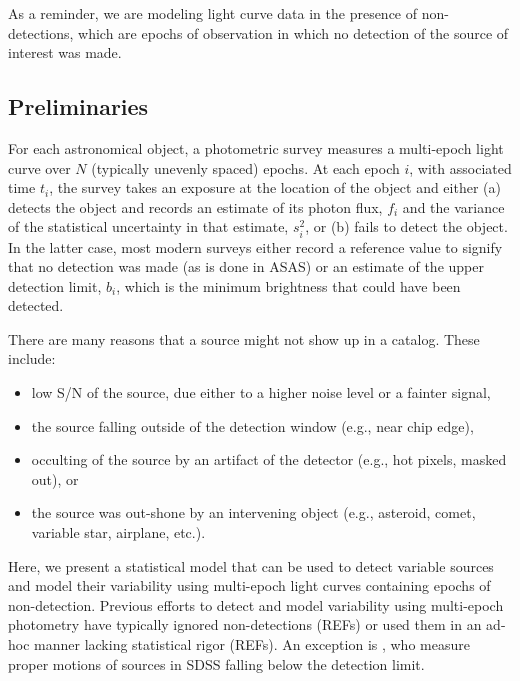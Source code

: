 \documentclass[12pt,preprint]{aastex}
\newcommand{\fobs}{f_i}
\newcommand{\sobs}{s^2_i}
\begin{document}

As a reminder, we are modeling light curve data in the presence of non-detections, which are epochs of observation in which no detection of the source of interest was made.

\subsection{Preliminaries}
\label{ss:prelim}

For each astronomical object, a photometric survey measures a multi-epoch light curve over $N$ (typically unevenly spaced) epochs.  At each epoch $i$, with associated time $t_i$, the survey takes an exposure at the location of the object and either (a) detects the object and records an estimate of its photon flux, $\fobs$ and the  variance of the statistical uncertainty in that estimate, $\sobs$, or (b) fails to detect the object.  In the latter case, most modern surveys either record a reference value to signify that no detection was made (as is done in ASAS) or an estimate of the upper detection limit, $b_i$, which is the minimum brightness that could have been detected.

There are many reasons that a source might not show up in a catalog.  These include:
\begin{itemize}
\item low S/N of the source, due either to a higher noise level or a fainter signal,
\item the source falling outside of the detection window (e.g., near chip edge),
\item occulting of the source by an artifact of the detector (e.g., hot pixels, masked out), or
\item the source was out-shone by an intervening object (e.g., asteroid, comet, variable star, airplane, etc.).
\end{itemize}
Here, we present a statistical model that can be used to detect variable sources and model their variability using multi-epoch light curves containing epochs of non-detection.  Previous efforts to detect and model variability using multi-epoch photometry have typically ignored non-detections (REFs) or used them in an ad-hoc manner lacking statistical rigor (REFs).  An exception is \citet{2009AJ....137.4400L}, who measure proper motions of sources in SDSS falling below the detection limit.
\end{document}
